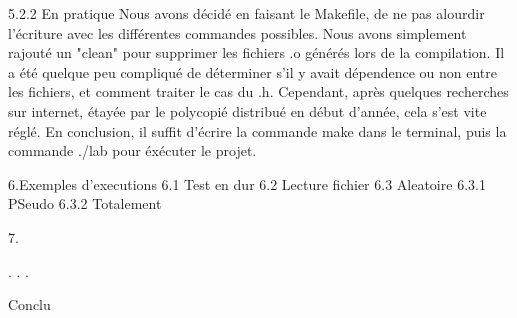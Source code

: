 5.2.2 En pratique
Nous avons décidé en faisant le Makefile, de ne pas alourdir l'écriture avec les différentes commandes possibles.
Nous avons simplement rajouté un "clean" pour supprimer les fichiers .o générés lors de la compilation. Il a été quelque peu compliqué de déterminer s'il y avait dépendence ou non entre les fichiers, et comment traiter le cas du .h. Cependant, après quelques recherches sur internet, étayée par le polycopié distribué en début d'année, cela s'est vite réglé. 
En conclusion, il suffit d'écrire la commande make dans le terminal, puis la commande ./lab pour éxécuter le projet.

6.Exemples d'executions
6.1 Test en dur
6.2 Lecture fichier
6.3 Aleatoire
6.3.1 PSeudo
6.3.2 Totalement

7.


.
.
.

Conclu
